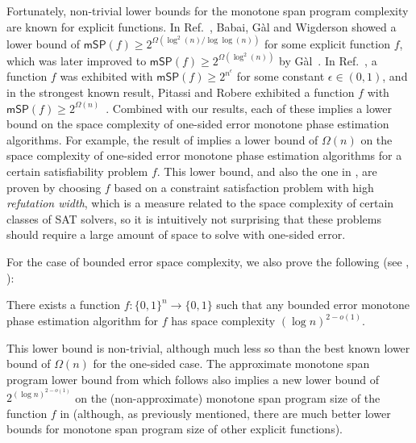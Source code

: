 \documentclass{toc}
\begin{document}
Fortunately, non-trivial lower bounds for the monotone span program complexity are known for explicit functions. In Ref.~\cite{BGW99}, Babai, G\`al and Wigderson showed a lower bound of $\mathsf{mSP}(f) \geq 2^{\Omega\left(\log^2(n)/\log\log(n)\right)}$ for some explicit function $f$, which was later improved to $\mathsf{mSP}(f)\geq 2^{\Omega(\log^2(n))}$ by G\`al~\cite{Gal01}. In Ref.~\cite{RPRC16}, a function $f$ was exhibited with $\mathsf{mSP}(f)\geq 2^{n^{\epsilon}}$ for some constant $\epsilon\in (0,1)$, and in the strongest known result, Pitassi and Robere exhibited a function $f$ with $\mathsf{mSP}(f)\geq 2^{\Omega(n)}$~\cite{PR17}. 
Combined with our results, each of these implies a lower bound on the space complexity of one-sided error monotone phase estimation algorithms. For example, the result of \cite{PR17} implies a lower bound of $\Omega(n)$ on the space complexity of one-sided error monotone phase estimation algorithms for a certain satisfiability problem $f$. This lower bound, and also the one in \cite{RPRC16}, are proven by choosing $f$ based on a constraint satisfaction problem with high \emph{refutation width}, which is a measure related to the space complexity of certain classes of SAT solvers, so it is intuitively not surprising that these problems should require a large amount of space to solve with one-sided error. 

For the case of bounded error space complexity, we also prove the following (see , ):
\begin{theorem}[Informal]\label{thm:explicit-informal}
There exists a function $f:\{0,1\}^n\rightarrow\{0,1\}$ such that any bounded error monotone phase estimation algorithm for $f$ has space complexity $(\log n)^{2-o(1)}$. 
\end{theorem}
This lower bound is non-trivial, although much less so than the best known lower bound of $\Omega(n)$ for the one-sided case.  
The approximate monotone span program lower bound from which  follows also implies a new lower bound of $2^{(\log n)^{2-o(1)}}$ on the (non-approximate) monotone span program size of the function $f$ in  (although, as previously mentioned, there are much better lower bounds for monotone span program size of other explicit functions).
\end{document}
